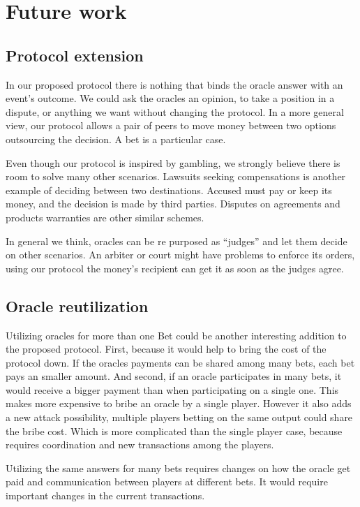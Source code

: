 \section{Future work}
\subsection{Protocol extension}

In our proposed protocol there is nothing that binds the oracle answer with an
  event's outcome.
We could ask the oracles an opinion, to take a position in a dispute, or
  anything we want without changing the protocol.
In a more general view, our protocol allows a pair of peers to move money
  between two options outsourcing the decision.
A bet is a particular case.

Even though our protocol is inspired by gambling, we strongly believe there is
  room to solve many other scenarios.
Lawsuits  seeking compensations is another example of deciding between two
  destinations.
Accused must pay or keep its money, and the decision is made by third parties.
Disputes on agreements and products warranties are other similar schemes.

In general we think, oracles can be re purposed as ``judges'' and let them
  decide on other scenarios.
An arbiter or court might have problems to enforce its orders, using our
  protocol the money's recipient can get it as soon as the judges agree.

\subsection{Oracle reutilization}
Utilizing oracles for more than one Bet could be another interesting addition to
  the proposed protocol.
First, because it would help to bring the cost of the protocol down.
If the oracles payments can be shared among many bets, each bet pays
  an smaller amount.
And second, if an oracle participates in many bets, it would receive a bigger
  payment than when participating on a single one.
This makes more expensive to bribe an oracle by a single player.
However it also adds a new attack possibility, multiple players betting on the
  same output could share the bribe cost.
Which is more complicated than the single player case, because requires
  coordination and new transactions among the players.

Utilizing the same answers for many bets requires changes on how the oracle get
  paid and communication between players at different bets.
It would require important changes in the current transactions.
